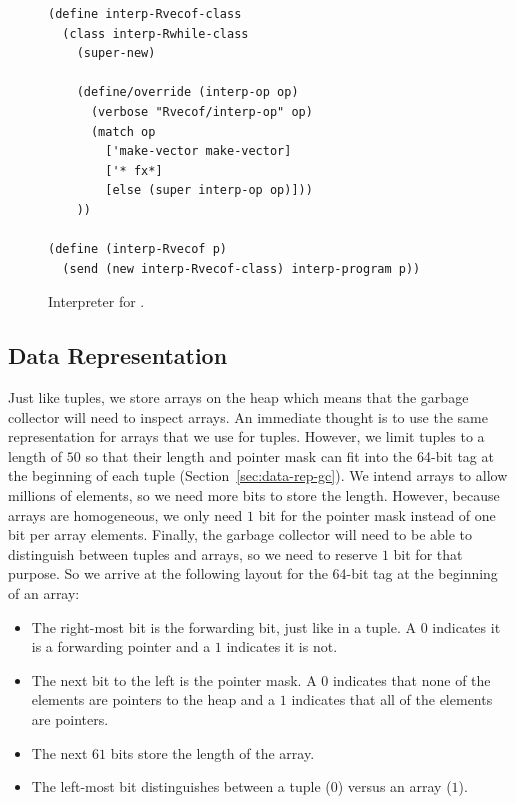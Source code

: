 \documentclass[11pt]{book}
\begin{document}
\begin{figure}[tbp]
\begin{lstlisting}[basicstyle=\ttfamily\footnotesize]
(define interp-Rvecof-class
  (class interp-Rwhile-class
    (super-new)

    (define/override (interp-op op)
      (verbose "Rvecof/interp-op" op)
      (match op
        ['make-vector make-vector]
        ['* fx*]
        [else (super interp-op op)]))
    ))

(define (interp-Rvecof p)
  (send (new interp-Rvecof-class) interp-program p))
\end{lstlisting}
\caption{Interpreter for \LangArray{}.}
\label{fig:interp-Rvecof}
\end{figure}


\subsection{Data Representation}
\label{sec:array-rep}

Just like tuples, we store arrays on the heap which means that the
garbage collector will need to inspect arrays. An immediate thought is
to use the same representation for arrays that we use for tuples.
However, we limit tuples to a length of $50$ so that their length and
pointer mask can fit into the 64-bit tag at the beginning of each
tuple (Section~\ref{sec:data-rep-gc}). We intend arrays to allow
millions of elements, so we need more bits to store the length.
However, because arrays are homogeneous, we only need $1$ bit for the
pointer mask instead of one bit per array elements.  Finally, the
garbage collector will need to be able to distinguish between tuples
and arrays, so we need to reserve $1$ bit for that purpose.  So we
arrive at the following layout for the 64-bit tag at the beginning of
an array:
\begin{itemize}
\item The right-most bit is the forwarding bit, just like in a tuple.
  A $0$ indicates it is a forwarding pointer and a $1$ indicates
  it is not.
  
\item The next bit to the left is the pointer mask. A $0$ indicates
  that none of the elements are pointers to the heap and a $1$
  indicates that all of the elements are pointers.

\item The next $61$ bits store the length of the array.

\item The left-most bit distinguishes between a tuple ($0$) versus an
  array ($1$).
\end{itemize}
\end{document}
